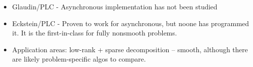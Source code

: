 \documentclass[a4paper,11pt,fleqn]{article}
\theoremstyle{plain}{\theorembodyfont{\rmfamily}%
\newtheorem{conjecture}[theorem]{Conjecture}}
\theoremstyle{plain}{\theorembodyfont{\rmfamily}%
\newtheorem{example}[theorem]{Example}}
\theoremstyle{plain}{\theorembodyfont{\rmfamily}%
\newtheorem{remark}[theorem]{Remark}}
\theoremstyle{plain}{\theorembodyfont{\rmfamily}%
\newtheorem{algorithm}[theorem]{Algorithm}}
\theoremstyle{plain}{\theorembodyfont{\rmfamily}%
\newtheorem{condition}[theorem]{Condition}}
\theoremstyle{plain}{\theorembodyfont{\rmfamily}%
\newtheorem{definition}[theorem]{Definition}}
\theoremstyle{plain}{\theorembodyfont{\rmfamily}
\newtheorem{fact}[theorem]{Fact}}
\theoremstyle{plain}{\theorembodyfont{\rmfamily}
\newtheorem{problem}[theorem]{Problem}}
\theoremstyle{plain}{\theorembodyfont{\rmfamily}
\newtheorem{notation}[theorem]{Notation}}
\theoremstyle{plain}{\theorembodyfont{\rmfamily}
\newtheorem{project}[theorem]{Project}}
\begin{document}
\begin{itemize}
\item
Glaudin/PLC - Asynchronous implementation has not been studied
\item
Eckstein/PLC - Proven to work for asynchronous, but noone has
programmed it. It is the first-in-class for fully nonsmooth
problems.
\item
Application areas:
low-rank + sparse decomposition -- smooth, although there are
likely problem-specific algos to compare.
\end{itemize}
\end{document}
